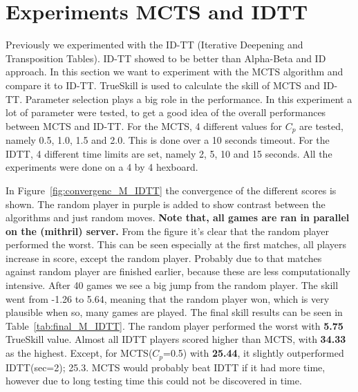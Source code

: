 \documentclass{article}
\begin{document}
\section{Experiments MCTS and IDTT}
Previously we experimented with the ID-TT (Iterative Deepening and Transposition Tables). ID-TT showed to be better than Alpha-Beta and ID approach. In this section we want to experiment with the MCTS algorithm and compare it to ID-TT.  TrueSkill is used to calculate the skill of MCTS and ID-TT.  Parameter selection plays a big role in the performance. In this experiment a lot of parameter were tested, to get a good idea of the overall performances between MCTS and ID-TT.  For the MCTS, 4 different values for $C_p$ are tested, namely 0.5, 1.0, 1.5 and 2.0. This is done over a 10 seconds timeout. For the IDTT, 4 different time limits are set, namely 2, 5, 10 and 15 seconds. All the experiments were done on a 4 by 4 hexboard.

In Figure~\ref{fig:convergenc_M_IDTT} the convergence of the different scores is shown. The random player in purple is added to show contrast between the algorithms and just random moves. \textbf{Note that, all games are ran in parallel on the (mithril) server.} From the figure it’s clear that the random player performed the worst. This can be seen especially at the first matches, all players increase in score, except the random player. Probably due to that matches against random player are finished earlier, because these are less computationally intensive. After 40 games we see a big jump from the random player. The skill went from -1.26 to 5.64, meaning that the random player won, which is very plausible when so, many games are played. The final skill results can be seen in Table~\ref{tab:final_M_IDTT}. The random player performed the worst with \textbf{5.75} TrueSkill value. Almost all IDTT players scored higher than MCTS, with \textbf{34.33} as the highest. Except, for MCTS($C_p$=0.5) with \textbf{25.44}, it slightly outperformed IDTT(sec=2);  25.3. MCTS would probably beat IDTT if it had more time, however due to long testing time this could not be discovered in time.
\end{document}
